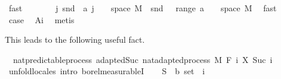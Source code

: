 \begin{isabellebody}
\ fast\isanewline
\ \ \ \ \isamarkupfalse%
\ \isamarkupfalse%
\ {\isachardoublequoteopen}{\isacharparenleft}{\kern0pt}{\isasymUnion}j{\isachardot}{\kern0pt}\ snd\ {\isacharbackquote}{\kern0pt}\ {\isacharparenleft}{\kern0pt}a\ j\ {\isasyminter}\ {\isacharparenleft}{\kern0pt}{\isacharbraceleft}{\kern0pt}{}{\isacharbraceright}{\kern0pt}\ {\isasymtimes}\ space\ M{\isacharparenright}{\kern0pt}{\isacharparenright}{\kern0pt}{\isacharparenright}{\kern0pt}\ {\isacharequal}{\kern0pt}\ snd\ {\isacharbackquote}{\kern0pt}\ {\isacharparenleft}{\kern0pt}{\isasymUnion}\ {\isacharparenleft}{\kern0pt}range\ a{\isacharparenright}{\kern0pt}\ {\isasyminter}\ {\isacharparenleft}{\kern0pt}{\isacharbraceleft}{\kern0pt}{}{\isacharbraceright}{\kern0pt}\ {\isasymtimes}\ space\ M{\isacharparenright}{\kern0pt}{\isacharparenright}{\kern0pt}{\isachardoublequoteclose}\ \isamarkupfalse%
\ fast\isanewline
\ \ \ \ \isamarkupfalse%
\ \isamarkupfalse%
\ {\isacharquery}{\kern0pt}case\ \isamarkupfalse%
\ A{\isacharunderscore}{\kern0pt}i\ \isamarkupfalse%
\ metis\isanewline
\ \ \isacommand{{\isacharbraceright}{\kern0pt}}\isamarkupfalse%
\isanewline
{}\isamarkupfalse%
%
\endisatagproof
{\isafoldproof}%
%
\isadelimproof
%
\endisadelimproof
%
\begin{isamarkuptext}%
This leads to the following useful fact.%
\end{isamarkuptext}\isamarkuptrue%
\isamarkupfalse%
\ {\isacharparenleft}{\kern0pt}\ nat{\isacharunderscore}{\kern0pt}predictable{\isacharunderscore}{\kern0pt}process{\isacharparenright}{\kern0pt}\ adapted{\isacharunderscore}{\kern0pt}Suc{\isacharcolon}{\kern0pt}\ {\isachardoublequoteopen}nat{\isacharunderscore}{\kern0pt}adapted{\isacharunderscore}{\kern0pt}process\ M\ F\ {\isacharparenleft}{\kern0pt}{\isasymlambda}i{\isachardot}{\kern0pt}\ X\ {\isacharparenleft}{\kern0pt}Suc\ i{\isacharparenright}{\kern0pt}{\isacharparenright}{\kern0pt}{\isachardoublequoteclose}\isanewline
%
\isadelimproof
%
\endisadelimproof
%
\isatagproof
{}\isamarkupfalse%
\ {\isacharparenleft}{\kern0pt}unfold{\isacharunderscore}{\kern0pt}locales{\isacharcomma}{\kern0pt}\ intro\ borel{\isacharunderscore}{\kern0pt}measurableI{\isacharparenright}{\kern0pt}\isanewline
\ \ \isamarkupfalse%
\ S\ {\isacharcolon}{\kern0pt}{\isacharcolon}{\kern0pt}\ {\isachardoublequoteopen}{\isacharprime}{\kern0pt}b\ set{\isachardoublequoteclose}\ \ i\ \isamarkupfalse%

\end{isabellebody}
